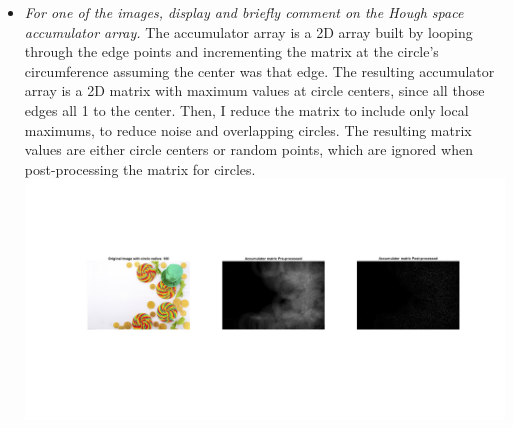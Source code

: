 \documentclass[11pt]{article}
\begin{document}
\begin{itemize}
        \item \textit{For one of the images, display and briefly comment on the Hough space accumulator array.}\newline
        The accumulator array is a 2D array built by looping through the edge points and incrementing the matrix at
        the circle's circumference assuming the center was that edge. The resulting accumulator array is a 2D matrix
        with maximum values at circle centers, since all those edges all 1 to the center. Then, I reduce the matrix
        to include only local maximums, to reduce noise and overlapping circles. The resulting matrix values are
        either circle centers or random points, which are ignored when post-processing the matrix for circles.\newline
        \includegraphics[width=\textwidth]{Output Pictures/hough_accumulator}\newline


\end{itemize}
\end{document}
